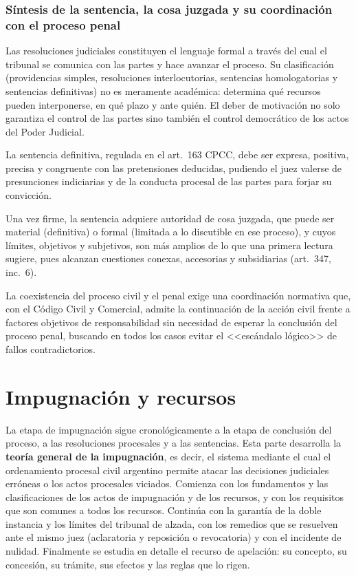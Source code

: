 \documentclass[12pt,oneside]{book}
\begin{document}
\section{Síntesis de la sentencia, la cosa juzgada y su coordinación con el proceso penal}
Las resoluciones judiciales constituyen el lenguaje formal a través del cual el tribunal se comunica con las partes y hace avanzar el proceso. Su clasificación (providencias simples, resoluciones interlocutorias, sentencias homologatorias y sentencias definitivas) no es meramente académica: determina qué recursos pueden interponerse, en qué plazo y ante quién. El deber de motivación no solo garantiza el control de las partes sino también el control democrático de los actos del Poder Judicial.

La sentencia definitiva, regulada en el art.~163 CPCC, debe ser expresa, positiva, precisa y congruente con las pretensiones deducidas, pudiendo el juez valerse de presunciones indiciarias y de la conducta procesal de las partes para forjar su convicción.

Una vez firme, la sentencia adquiere autoridad de cosa juzgada, que puede ser material (definitiva) o formal (limitada a lo discutible en ese proceso), y cuyos límites, objetivos y subjetivos, son más amplios de lo que una primera lectura sugiere, pues alcanzan cuestiones conexas, accesorias y subsidiarias (art.~347, inc.~6\textordmasculine).

La coexistencia del proceso civil y el penal exige una coordinación normativa que, con el Código Civil y Comercial, admite la continuación de la acción civil frente a factores objetivos de responsabilidad sin necesidad de esperar la conclusión del proceso penal, buscando en todos los casos evitar el <<escándalo lógico>> de fallos contradictorios.

\part{Impugnación y recursos}
La etapa de impugnación sigue cronológicamente a la etapa de conclusión del proceso, a las resoluciones procesales y a las sentencias. Esta parte desarrolla la \textbf{teoría general de la impugnación}, es decir, el sistema mediante el cual el ordenamiento procesal civil argentino permite atacar las decisiones judiciales erróneas o los actos procesales viciados. Comienza con los fundamentos y las clasificaciones de los actos de impugnación y de los recursos, y con los requisitos que son comunes a todos los recursos. Continúa con la garantía de la doble instancia y los límites del tribunal de alzada, con los remedios que se resuelven ante el mismo juez (aclaratoria y reposición o revocatoria) y con el incidente de nulidad. Finalmente se estudia en detalle el recurso de apelación: su concepto, su concesión, su trámite, sus efectos y las reglas que lo rigen.
\end{document}
